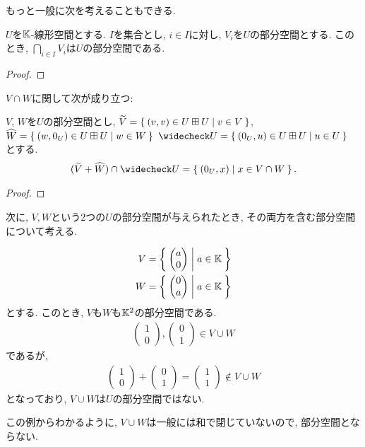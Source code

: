 もっと一般に次を考えることもできる.
\begin{example}
  $U$を$\mathbb{K}$-線形空間とする.
  $I$を集合とし,
  $i\in I$に対し, $V_i$を$U$の部分空間とする.
  このとき, $\bigcap_{i\in I}V_i$は$U$の部分空間である.
\end{example}
\begin{proof}\end{proof}

$V\cap W$に関して次が成り立つ:
\begin{prop}
  \label{thm:intersection:calc}
  $V$, $W$を$U$の部分空間とし,
  $\widetilde V =\Set{(v,v)\in U\boxplus U|v\in V}$,
  $\widehat W =\Set{(w,0_U)\in U\boxplus U|w\in W}$
  $\widecheck U =\Set{(0_U,u)\in U\boxplus U|u\in U}$
  とする.
  \begin{align*}
    (\widetilde V+\widehat W)\cap \widecheck U
    =
    \Set{(0_U,x)|x\in V\cap W}.
  \end{align*}
\end{prop}
\begin{proof}\end{proof}

次に, $V,W$という2つの$U$の部分空間が与えられたとき,
その両方を含む部分空間について考える.

\begin{example}
  \label{subspace:nonexample:cup}
  \begin{align*}
    V&=\Set{\begin{pmatrix}a\\0\end{pmatrix}|a\in\mathbb{K}}\\
    W&=\Set{\begin{pmatrix}0\\a\end{pmatrix}|a\in\mathbb{K}}
  \end{align*}
  とする.
  このとき, $V$も$W$も$\mathbb{K}^2$の部分空間である.
  \begin{align*}
    \begin{pmatrix}1\\0\end{pmatrix},
    \begin{pmatrix}0\\1\end{pmatrix}\in V\cup W
  \end{align*}
  であるが,
  \begin{align*}
    \begin{pmatrix}1\\0\end{pmatrix}+
    \begin{pmatrix}0\\1\end{pmatrix}=\begin{pmatrix}1\\1\end{pmatrix}\not\in V\cup W
  \end{align*}
  となっており, $V\cup W$は$U$の部分空間ではない.
\end{example}
この例からわかるように, $V\cup W$は一般には和で閉じていないので,
部分空間とならない.

